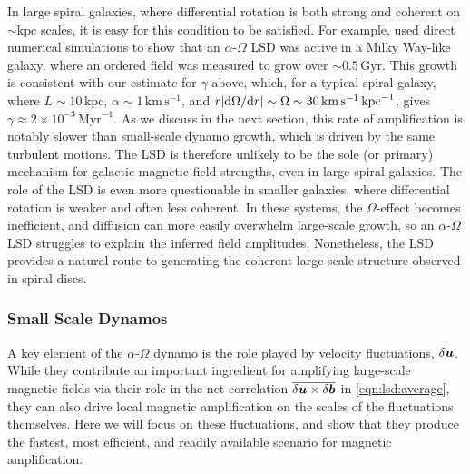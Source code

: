 In large spiral galaxies, where differential rotation is both strong and coherent on $\sim \mathrm{kpc}$ scales, it is easy for this condition to be satisfied. For example, \citet{ntormousi2020dynamo} used direct numerical simulations to show that an $\alpha$-$\Omega$ LSD was active in a Milky Way-like galaxy, where an ordered field was measured to grow over $\sim 0.5 \,\mathrm{Gyr}$. This growth is consistent with our estimate for $\gamma$ above, which, for a typical spiral-galaxy, where $L \sim 10 \,\mathrm{kpc}$, $\alpha \sim 1 \,\mathrm{km} \,\mathrm{s}^{-1}$, and $r |\mathrm{d} \Omega / \mathrm{d} r| \sim \Omega \sim 30 \,\mathrm{km} \,\mathrm{s}^{-1} \,\mathrm{kpc}^{-1}$, gives $\gamma \approx 2\times 10^{-3} \,\mathrm{Myr}^{-1}$. As we discuss in the next section, this rate of amplification is notably slower than small-scale dynamo growth, which is driven by the same turbulent motions. The LSD is therefore unlikely to be the sole (or primary) mechanism for galactic magnetic field strengths, even in large spiral galaxies. The role of the LSD is even more questionable in smaller galaxies, where differential rotation is weaker and often less coherent. In these systems, the $\Omega$-effect becomes inefficient, and diffusion can more easily overwhelm large-scale growth, so an $\alpha$-$\Omega$ LSD struggles to explain the inferred field amplitudes. Nonetheless, the LSD provides a natural route to generating the coherent large-scale structure observed in spiral discs.


\subsubsection{Small Scale Dynamos}
\label{sec:evolve:ssd}

A key element of the $\alpha$-$\Omega$ dynamo is the role played by velocity fluctuations, $\delta\bm{u}$. While they contribute an important ingredient for amplifying large-scale magnetic fields via their role in the net correlation $\overline{\delta\bm{u}\times\delta\bm{b}}$ in \autoref{eqn:lsd:average}, they can also drive local magnetic amplification on the scales of the fluctuations themselves. Here we will focus on these fluctuations, and show that they produce the fastest, most efficient, and readily available scenario for magnetic amplification.

